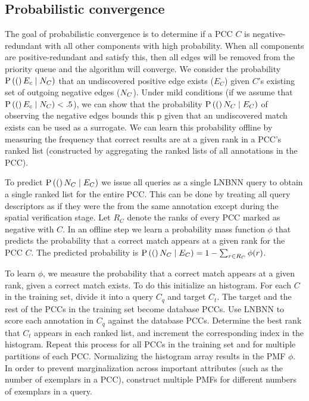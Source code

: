 \subsection{Probabilistic convergence}
The goal of probabilistic convergence is to determine if a PCC $C$ is negative-redundant with all other components with
high probability. When all components are positive-redundant and satisfy this, then all edges will be removed from the
priority queue and the algorithm will converge. We consider the probability $\mathbin{\mathbin{\operatorname{P}}}\left((\right)E_c \mid N_C)$ that an undiscovered
positive edge exists ($E_C$) given $C$'s existing set of outgoing negative edges ($N_C$). Under mild conditions (if we
assume that $\mathbin{\mathbin{\operatorname{P}}}\left((\right)E_c \mid N_C) < .5$), we can show that the probability $\mathbin{\mathbin{\operatorname{P}}}\left((\right)N_C \mid E_C)$ of observing the
negative edges bounds this p given that an undiscovered match exists can be used as a surrogate. We can learn this
probability offline by measuring the frequency that correct results are at a given rank in a PCC's ranked list
(constructed by aggregating the ranked lists of all annotations in the PCC).

To predict $\mathbin{\mathbin{\operatorname{P}}}\left((\right)N_C \mid E_C)$ we issue all queries as a single LNBNN query to obtain a single ranked list for the
entire PCC. This can be done by treating all query descriptors as if they were the from the same annotation except
during the spatial verification stage. Let $R_C$ denote the ranks of every PCC marked as negative with $C$. In an
offline step we learn a probability mass function $\phi$ that predicts the probability that a correct match appears at a
given rank for the PCC $C$. The predicted probability is %
$\mathbin{\mathbin{\operatorname{P}}}\left((\right)N_C \mid E_C) = 1 - \sum_{r \in R_C} \phi(r)$.

To learn $\phi$, we measure the probability that a correct match appears at a given rank, given a correct match exists.
To do this initialize an histogram. For each $C$ in the training set, divide it into a query $C_q$ and target $C_t$. The
target and the rest of the PCCs in the training set become database PCCs. Use LNBNN to score each annotation in $C_q$
against the database PCCs. Determine the best rank that $C_t$ appears in each ranked list, and increment the
corresponding index in the histogram. Repeat this process for all PCCs in the training set and for multiple partitions
of each PCC. Normalizing the histogram array results in the PMF $\phi$. In order to prevent marginalization across
important attributes (such as the number of exemplars in a PCC), construct multiple PMFs for different numbers of
exemplars in a query.


